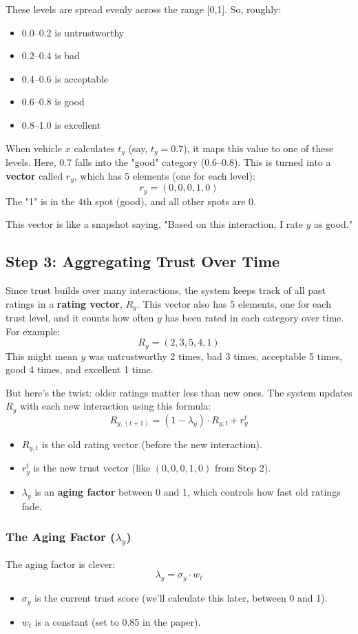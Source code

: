 \documentclass{article}
\begin{document}
These levels are spread evenly across the range [0,1]. So, roughly:
\begin{itemize}
    \item 0.0--0.2 is untrustworthy
    \item 0.2--0.4 is bad
    \item 0.4--0.6 is acceptable
    \item 0.6--0.8 is good
    \item 0.8--1.0 is excellent
\end{itemize}

When vehicle \(x\) calculates \(t_y\) (say, \(t_y = 0.7\)), it maps this value to one of these levels. Here, 0.7 falls into the "good" category (0.6--0.8). This is turned into a \textbf{vector} called \(r_y\), which has 5 elements (one for each level):
\[
r_y = (0, 0, 0, 1, 0)
\]
The "1" is in the 4th spot (good), and all other spots are 0.

This vector is like a snapshot saying, "Based on this interaction, I rate \(y\) as good."

\subsection*{Step 3: Aggregating Trust Over Time}
Since trust builds over many interactions, the system keeps track of all past ratings in a \textbf{rating vector}, \(R_y\). This vector also has 5 elements, one for each trust level, and it counts how often \(y\) has been rated in each category over time. For example:
\[
R_y = (2, 3, 5, 4, 1)
\]
This might mean \(y\) was untrustworthy 2 times, bad 3 times, acceptable 5 times, good 4 times, and excellent 1 time.

But here's the twist: older ratings matter less than new ones. The system updates \(R_y\) with each new interaction using this formula:
\[
R_{y,(t+1)} = (1 - \lambda_y) \cdot R_{y,t} + r_y^t
\]
\begin{itemize}
    \item \(R_{y,t}\) is the old rating vector (before the new interaction).
    \item \(r_y^t\) is the new trust vector (like \( (0, 0, 0, 1, 0) \) from Step 2).
    \item \(\lambda_y\) is an \textbf{aging factor} between 0 and 1, which controls how fast old ratings fade.
\end{itemize}

\subsubsection*{The Aging Factor (\(\lambda_y\))}
The aging factor is clever:
\[
\lambda_y = \sigma_y \cdot w_t
\]
\begin{itemize}
    \item \(\sigma_y\) is the current trust score (we'll calculate this later, between 0 and 1).
    \item \(w_t\) is a constant (set to 0.85 in the paper).
\end{itemize}
\end{document}
